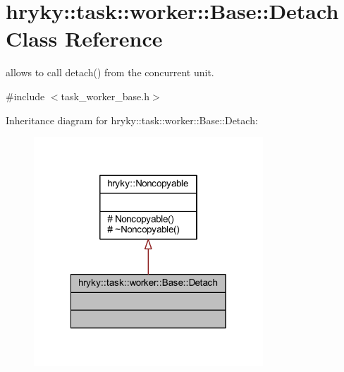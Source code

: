 \hypertarget{classhryky_1_1task_1_1worker_1_1_base_1_1_detach}{\section{hryky\-:\-:task\-:\-:worker\-:\-:Base\-:\-:Detach Class Reference}
\label{classhryky_1_1task_1_1worker_1_1_base_1_1_detach}
}


allows to call detach() from the concurrent unit.  




{\ttfamily \#include $<$task\-\_\-worker\-\_\-base.\-h$>$}



Inheritance diagram for hryky\-:\-:task\-:\-:worker\-:\-:Base\-:\-:Detach\-:\nopagebreak
\begin{figure}[H]
\begin{center}
\leavevmode
\includegraphics[width=244pt]{classhryky_1_1task_1_1worker_1_1_base_1_1_detach__inherit__graph}
\end{center}
\end{figure}
